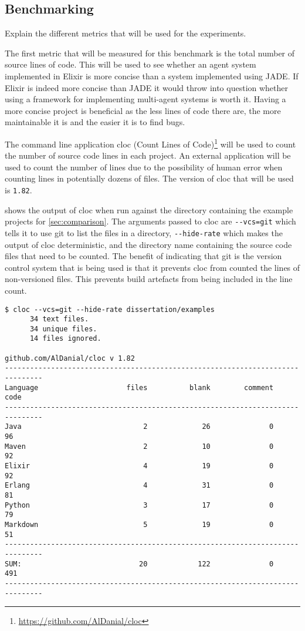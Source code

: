 \subsection{Benchmarking}

Explain the different metrics that will be used for the experiments.

The first metric that will be measured for this benchmark is the total number of source lines of code.
This will be used to see whether an agent system implemented in Elixir is more concise than a system implemented using JADE\@.
If Elixir is indeed more concise than JADE it would throw into question whether using a framework for implementing multi-agent systems is worth it.
Having a more concise project is beneficial as the less lines of code there are, the more maintainable it is and the easier it is to find bugs.

The command line application cloc (Count Lines of Code)\footnote{\url{https://github.com/AlDanial/cloc}} will be used to count the number of source code lines in each project.
An external application will be used to count the number of lines due to the possibility of human error when counting lines in potentially dozens of files.
The version of cloc that will be used is \verb|1.82|.

 shows the output of cloc when run against the directory containing the example projects for \cref{sec:comparison}.
The arguments passed to cloc are \verb|--vcs=git| which tells it to use git to list the files in a directory, \verb|--hide-rate| which makes the output of cloc deterministic, and the directory name containing the source code files that need to be counted.
The benefit of indicating that git is the version control system that is being used is that it prevents cloc from counted the lines of non-versioned files.
This prevents build artefacts from being included in the line count.

\begin{lstlisting}[numbers=none,float=h,label=lst:cloc,caption=Output of cloc when run on the example projects]
$ cloc --vcs=git --hide-rate dissertation/examples
      34 text files.
      34 unique files.
      14 files ignored.

github.com/AlDanial/cloc v 1.82
-------------------------------------------------------------------------------
Language                     files          blank        comment           code
-------------------------------------------------------------------------------
Java                             2             26              0             96
Maven                            2             10              0             92
Elixir                           4             19              0             92
Erlang                           4             31              0             81
Python                           3             17              0             79
Markdown                         5             19              0             51
-------------------------------------------------------------------------------
SUM:                            20            122              0            491
-------------------------------------------------------------------------------
\end{lstlisting}

